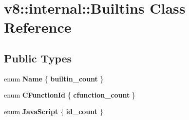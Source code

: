 \hypertarget{classv8_1_1internal_1_1_builtins}{}\section{v8\+:\+:internal\+:\+:Builtins Class Reference}
\label{classv8_1_1internal_1_1_builtins}
\subsection*{Public Types}
\begin{DoxyCompactItemize}
\item 
\hypertarget{classv8_1_1internal_1_1_builtins_af0fa18b8b976be56ea5cba1f88a5720e}{}enum {\bfseries Name} \{ {\bfseries builtin\+\_\+count}
 \}\label{classv8_1_1internal_1_1_builtins_af0fa18b8b976be56ea5cba1f88a5720e}

\item 
\hypertarget{classv8_1_1internal_1_1_builtins_a4b8719d456ae0289285e542440d1ad9e}{}enum {\bfseries C\+Function\+Id} \{ {\bfseries cfunction\+\_\+count}
 \}\label{classv8_1_1internal_1_1_builtins_a4b8719d456ae0289285e542440d1ad9e}

\item 
\hypertarget{classv8_1_1internal_1_1_builtins_a0f02160f66bb9a9dee9f8f0cda538c1d}{}enum {\bfseries Java\+Script} \{ {\bfseries id\+\_\+count}
 \}\label{classv8_1_1internal_1_1_builtins_a0f02160f66bb9a9dee9f8f0cda538c1d}

\end{DoxyCompactItemize}
